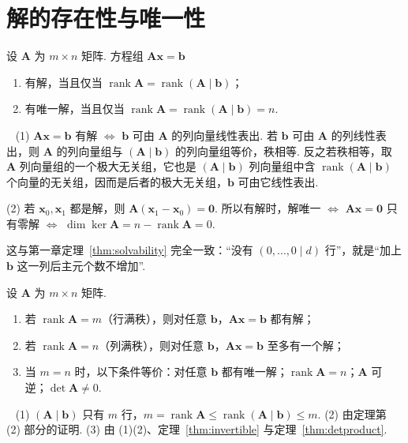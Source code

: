 \documentclass[lang=cn,10.5pt,scheme=chinese,toc=twocol,section,chinesefont=nofont,
twoside,citestyle=gb7714-2015,bibstyle=gb7714-2015]{elegantbook}
\DeclareRobustCommand{\textbf}[1]{{\lnsemiboldlatin\lnsemiboldcjk #1}}
\newcommand{\vv}[1]{\boldsymbol{#1}}
\newcommand{\zero}{\boldsymbol{0}}          %
\numberwithin{equation}{section}   %
\newcommand{\rk}{\operatorname{rank}}       %
\newcommand*{\lnlabel}[1]{{\sffamily\bfseries\color{black}#1}}
\renewenvironment{proof}{%
	\par\noindent\lnlabel{\proofname}\;\ \color{black!90}\cfs}{\par}
\begin{document}
\section{解的存在性与唯一性}\label{sec:sol-exist}

\begin{theorem}\label{thm:rouche}
  设 $\vv A$ 为 $m\times n$ 矩阵. 方程组 $\vv{Ax}=\vv b$
  \begin{enumerate}
    \item 有解，当且仅当 $\rk\vv A=\rk(\vv A\mid\vv b)$；
    \item 有唯一解，当且仅当 $\rk\vv A=\rk(\vv A\mid\vv b)=n$.
  \end{enumerate}
\end{theorem}
\begin{proof}
  (1) $\vv{Ax}=\vv b$ 有解 $\iff$ $\vv b$ 可由 $\vv A$ 的列向量线性表出. 若 $\vv b$ 可由 $\vv A$ 的列线性表出，则 $\vv A$ 的列向量组与 $(\vv A\mid\vv b)$ 的列向量组等价，秩相等. 反之若秩相等，取 $\vv A$ 列向量组的一个极大无关组，它也是 $(\vv A\mid\vv b)$ 列向量组中含 $\rk(\vv A\mid\vv b)$ 个向量的无关组，因而是后者的极大无关组，$\vv b$ 可由它线性表出.

  (2) 若 $\vv x_0,\vv x_1$ 都是解，则 $\vv A(\vv x_1-\vv x_0)=\zero$. 所以有解时，解唯一 $\iff$ $\vv{Ax}=\zero$ 只有零解 $\iff$ $\dim\ker\vv A=n-\rk\vv A=0$.
\end{proof}

这与第一章定理~\ref{thm:solvability} 完全一致：“没有 $(0,\ldots,0\mid d)$ 行”，就是“加上 $\vv b$ 这一列后主元个数不增加”.

\begin{corollary}
  \label{cor:sol-fullrank}
  设 $\vv A$ 为 $m\times n$ 矩阵.
  \begin{enumerate}
    \item 若 $\rk\vv A=m$（\textbf{行满秩}），则对\textbf{任意} $\vv b$，$\vv{Ax}=\vv b$ 都有解；
    \item 若 $\rk\vv A=n$（\textbf{列满秩}），则对任意 $\vv b$，$\vv{Ax}=\vv b$ \textbf{至多}有一个解；
    \item 当 $m=n$ 时，以下条件等价：对任意 $\vv b$ 都有唯一解；$\rk\vv A=n$；$\vv A$ 可逆；$\det\vv A\ne0$.
  \end{enumerate}
\end{corollary}
\begin{proof}
  (1) $(\vv A\mid\vv b)$ 只有 $m$ 行，$m=\rk\vv A\le\rk(\vv A\mid\vv b)\le m$. (2) 由定理第 (2) 部分的证明. (3) 由 (1)(2)、定理~\ref{thm:invertible} 与定理~\ref{thm:detproduct}.
\end{proof}
\end{document}
